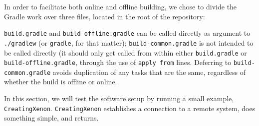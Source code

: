 In order to facilitate both online and offline building, we chose to divide the Gradle work over three files, located in the root of the repository:
\begin{enumerate}
\item{\texttt{build.gradle} }
\item{\texttt{build-offline.gradle}} }
\item{\texttt{build-common.gradle}} \index{Xenon!Gradle!build-common.gradle@\texttt{build-common.gradle}}}
\end{enumerate}

\texttt{build.gradle} and \texttt{build-offline.gradle} can be called directly as argument to \texttt{./gradlew} (or \texttt{gradle}, for that matter); \texttt{build-common.gradle} is not intended to be called directly (it should only get called from within either \texttt{build.gradle} or \texttt{build-offline.gradle}, through the use of \texttt{apply from} lines. Deferring to \texttt{build-common.gradle} avoids duplication of any tasks that are the same, regardless of whether the build is offline or online.




In this section, we will test the software setup by running a small example, \texttt{CreatingXenon}. \texttt{CreatingXenon} establishes a connection to a remote system, does something simple, and returns.


